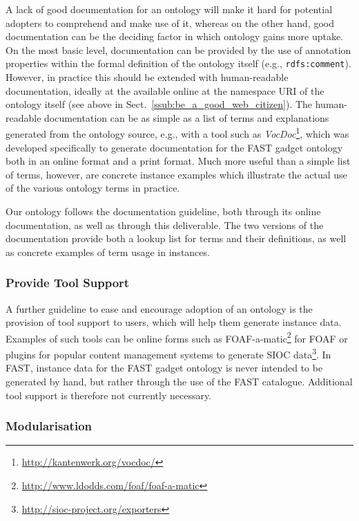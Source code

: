 \documentclass[twoside]{fast_latex}
\begin{document}
A lack of good documentation for an ontology will make it hard for potential adopters to comprehend and make use of it, whereas on the other hand, good documentation can be the deciding factor in which ontology gains more uptake. On the most basic level, documentation can be provided by the use of annotation properties within the formal definition of the ontology itself (e.g., \texttt{rdfs:comment}). However, in practice this should be extended with human-readable documentation, ideally at the available online at the namespace URI of the ontology itself (see above in Sect.~\ref{ssub:be_a_good_web_citizen}). The human-readable documentation can be as simple as a list of terms and explanations generated from the ontology source, e.g., with a tool such as \emph{VocDoc}\footnote{\url{http://kantenwerk.org/vocdoc/}}, which was developed specifically to generate documentation for the FAST gadget ontology both in an online format and a print format. Much more useful than a simple list of terms, however, are concrete instance examples which illustrate the actual use of the various ontology terms in practice.

Our ontology follows the documentation guideline, both through its online documentation, as well as through this deliverable. The two versions of the documentation provide both a lookup list for terms and their definitions, as well as concrete examples of term usage in instances.


\subsubsection{Provide Tool Support} %
\label{ssub:provide_tool_support}

A further guideline to ease and encourage adoption of an ontology is the provision of tool support to users, which will help them generate instance data. Examples of such tools can be online forms such as FOAF-a-matic\footnote{\url{http://www.ldodds.com/foaf/foaf-a-matic}} for FOAF or plugins for popular content management systems to generate SIOC data\footnote{\url{http://sioc-project.org/exporters}}. In FAST, instance data for the FAST gadget ontology is never intended to be generated by hand, but rather through the use of the FAST catalogue. Additional tool support is therefore not currently necessary.


\subsubsection{Modularisation} %
\label{ssub:modularisation}
\end{document}
